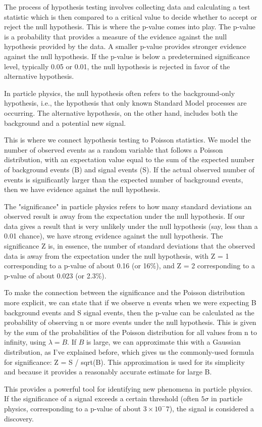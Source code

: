 The process of hypothesis testing involves collecting data and calculating a test statistic which is then compared to a
critical value to decide whether to accept or reject the null hypothesis. This is where the p-value comes into play. The
p-value is a probability that provides a measure of the evidence against the null hypothesis provided by the data. A
smaller p-value provides stronger evidence against the null hypothesis. If the p-value is below a predetermined
significance level, typically 0.05 or 0.01, the null hypothesis is rejected in favor of the alternative hypothesis.

In particle physics, the null hypothesis often refers to the background-only hypothesis, i.e., the hypothesis that only
known Standard Model processes are occurring. The alternative hypothesis, on the other hand, includes both the
background and a potential new signal.

This is where we connect hypothesis testing to Poisson statistics. We model the number of observed events as a random
variable that follows a Poisson distribution, with an expectation value equal to the sum of the expected number of
background events (B) and signal events (S). If the actual observed number of events is significantly larger than the
expected number of background events, then we have evidence against the null hypothesis.

The "significance" in particle physics refers to how many standard deviations an observed result is away from the
expectation under the null hypothesis. If our data gives a result that is very unlikely under the null hypothesis (say,
less than a 0.01 chance), we have strong evidence against the null hypothesis. The significance Z is, in essence, the
number of standard deviations that the observed data is away from the expectation under the null hypothesis, with Z = 1
corresponding to a p-value of about 0.16 (or 16\%), and Z = 2 corresponding to a p-value of about 0.023 (or 2.3\%).

To make the connection between the significance and the Poisson distribution more explicit, we can state that if we
observe n events when we were expecting B background events and S signal events, then the p-value can be calculated as
the probability of observing n or more events under the null hypothesis. This is given by the sum of the probabilities
of the Poisson distribution for all values from n to infinity, using $\lambda = B$. If $B$ is large, we can approximate this with
a Gaussian distribution, as I've explained before, which gives us the commonly-used formula for significance: Z = S /
sqrt(B). This approximation is used for its simplicity and because it provides a reasonably accurate estimate for large
B.

This provides a powerful tool for identifying new phenomena in particle physics. If the significance of a signal exceeds
a certain threshold (often $ 5 \sigma $ in particle physics, corresponding to a p-value of about $3\times10^-7$), the signal is
considered a discovery.